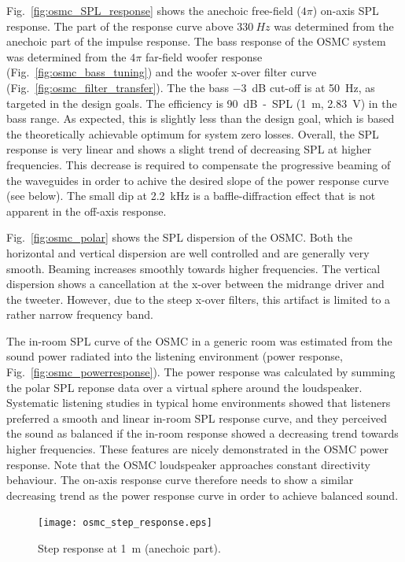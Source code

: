 \documentclass[12pt,a4paper]{article}
\providecommand{\figr}[1]{Fig.~\ref{fig:#1}}
\providecommand{\figlabel}[1]{\label{fig:#1}}
\begin{document}
\figr{osmc_SPL_response} shows the anechoic free-field ($4\pi$) on-axis SPL response. The part of the response curve above $\SI{330}{Hz}$ was determined from the anechoic part of the impulse response. The bass response of the OSMC system was determined from the $4\pi$ far-field woofer response (\figr{osmc_bass_tuning}) and the woofer x-over filter curve (\figr{osmc_filter_transfer}). The the bass \SI{-3}{dB} cut-off is at \SI{50}{Hz}, as targeted in the design goals. The efficiency is \SI{90}{dB-SPL} (\SI{1}{m}, \SI{2.83}{V}) in the bass range. As expected, this is slightly less than the design goal, which is based the theoretically achievable optimum for system zero losses. Overall, the SPL response is very linear and shows a slight trend of decreasing SPL at higher frequencies. This decrease is required to compensate the progressive beaming of the waveguides in order to achive the desired slope of the power response curve (see below). The small dip at \SI{2.2}{kHz} is a baffle-diffraction effect that is not apparent in the off-axis response.\par

\figr{osmc_polar} shows the SPL dispersion of the OSMC. Both the horizontal and vertical dispersion are well controlled and are generally very smooth. Beaming increases smoothly towards higher frequencies. The vertical dispersion shows a cancellation at the x-over between the midrange driver and the tweeter. However, due to the steep x-over filters, this artifact is limited to a rather narrow frequency band.\par

The in-room SPL curve of the OSMC in a generic room was estimated from the sound power radiated into the listening environment (power response, \figr{osmc_powerresponse}). The power response was calculated by summing the polar SPL reponse data over a virtual sphere around the loudspeaker.\cite{tylka,mat_lspr} Systematic listening studies in typical home environments showed that listeners preferred a smooth and linear in-room SPL response curve, and they perceived the sound as balanced if the in-room response showed a decreasing trend towards higher frequencies.\cite{osmc_p915} These features are nicely demonstrated in the OSMC power response. Note that the OSMC loudspeaker approaches constant directivity behaviour. The on-axis response curve therefore needs to show a similar decreasing trend as the power response curve in order to achieve balanced sound.


\begin{figure}[p]
	\centering
	\texttt{[image: osmc\_step\_response.eps]}
	\caption{Step response at \SI{1}{m} (anechoic part).}
	\figlabel{osmc_step_response}
\end{figure}
\end{document}
